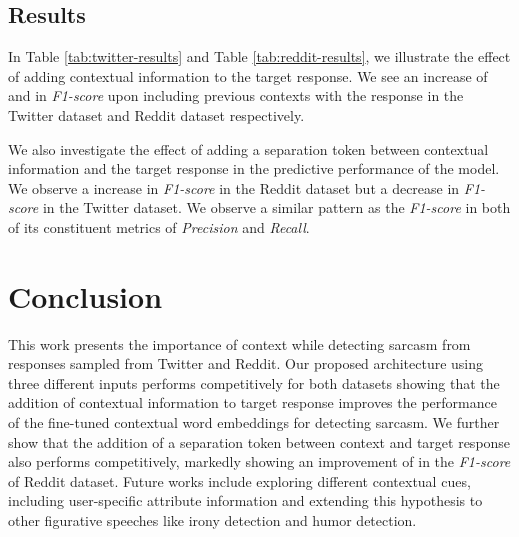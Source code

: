 \documentclass[11pt,a4paper]{article}
\begin{document}
\subsection{Results}

In Table \ref{tab:twitter-results} and Table \ref{tab:reddit-results}, we illustrate the effect of adding contextual information to the target response. We see an increase of  and  in \textit{F1-score} upon including previous contexts with the response in the Twitter dataset and Reddit dataset respectively. 

We also investigate the effect of adding a separation token between contextual information and the target response in the predictive performance of the model. We observe a  increase in \textit{F1-score} in the Reddit dataset but a  decrease in \textit{F1-score} in the Twitter dataset. We observe a similar pattern as the \textit{F1-score} in both of its constituent metrics of \textit{Precision} and \textit{Recall}.

\section{Conclusion}
This work presents the importance of context while detecting sarcasm from responses sampled from Twitter and Reddit. Our proposed architecture using three different inputs performs competitively for both datasets showing that the addition of contextual information to target response improves the performance of the fine-tuned contextual word embeddings for detecting sarcasm. We further show that the addition of a separation token between context and target response also performs competitively, markedly showing an improvement of  in the \textit{F1-score} of Reddit dataset. Future works include exploring different contextual cues, including user-specific attribute information and extending this hypothesis to other figurative speeches like irony detection and humor detection.




\appendix
\end{document}
